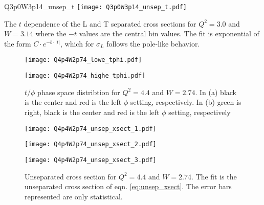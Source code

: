 \begin{Mfigure}{Q3p0W3p14_unsep_t}
  \centering
  \texttt{[image: Q3p0W3p14\_unsep\_t.pdf]}
  \caption{The $t$ dependence of the L and T separated cross sections for $Q^2=3.0$ and $W=3.14$ where the $-t$ values are the central bin values. The fit is exponential of the form $C\cdot e^{-b\cdot|t|}$, which for $\sigma_L$ follows the pole-like behavior.}
  \label{fig:Q3p0W3p14_unsep_t}
\end{Mfigure}

\clearpage


\begin{figure}
  \centering
  \begin{minipage}[b]{0.48\linewidth}
    \texttt{[image: Q4p4W2p74\_lowe\_tphi.pdf]}
  \end{minipage}
  \begin{minipage}[b]{0.48\linewidth}
    \texttt{[image: Q4p4W2p74\_highe\_tphi.pdf]}
  \end{minipage}  
  \caption{$t$/$\phi$ phase space distribtion for $Q^2=4.4$ and $W=2.74$. In (a) black is the center and red is the left $\phi$ setting, respectively. In (b) green is right, black is the center and red is the left $\phi$ setting, respectively}
  \label{fig:Q4p4W2p74_tphi}
\end{figure}

\begin{figure}
  \centering
    \begin{minipage}[b]{0.48\linewidth}
      \texttt{[image: Q4p4W2p74\_unsep\_xsect\_1.pdf]}
    \end{minipage}
    \hfill
    \begin{minipage}[b]{0.48\linewidth}
      \texttt{[image: Q4p4W2p74\_unsep\_xsect\_2.pdf]}
    \end{minipage}
    \begin{minipage}[b]{0.48\linewidth}
      \texttt{[image: Q4p4W2p74\_unsep\_xsect\_3.pdf]}
    \end{minipage}
  \caption{Unseparated cross section for $Q^2=4.4$ and $W=2.74$. The fit is the unseparated cross section of eqn. \ref{eq:unsep_xsect}. The error bars represented are only statistical.}
  \label{fig:Q4p4W2p74_unsep_xsect}
\end{figure}

